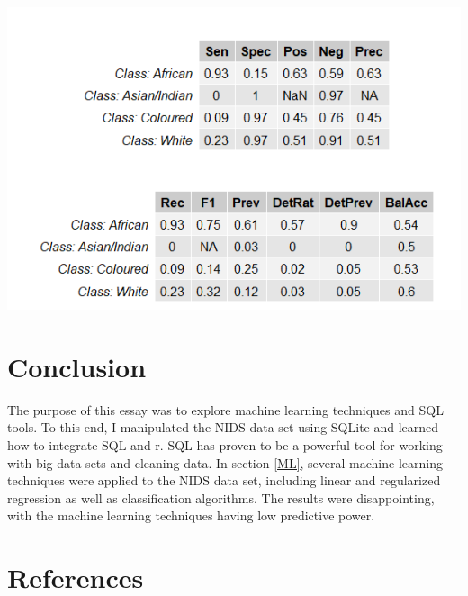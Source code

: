 \documentclass[11pt,preprint, authoryear]{elsarticle}
\let\origfigure\figure
\let\endorigfigure\endfigure
\renewenvironment{figure}[1][2] {
    \expandafter\origfigure\expandafter[H]
} {
    \endorigfigure
}
\numberwithin{equation}{section}
\numberwithin{figure}{section}
\numberwithin{table}{section}
\begin{document}
\begin{figure}[htbp]
\centering
\includegraphics{images/statsrf.png}
\caption{Random Forest Statistics \label{fig5}}
\end{figure}

\hypertarget{conclusion}{%
\section{\texorpdfstring{Conclusion
\label{con}}{Conclusion }}\label{conclusion}}

The purpose of this essay was to explore machine learning techniques and
SQL tools. To this end, I manipulated the NIDS data set using SQLite and
learned how to integrate SQL and r. SQL has proven to be a powerful tool
for working with big data sets and cleaning data. In section \ref{ML},
several machine learning techniques were applied to the NIDS data set,
including linear and regularized regression as well as classification
algorithms. The results were disappointing, with the machine learning
techniques having low predictive power.

\newpage

\hypertarget{references}{%
\section*{References}\label{references}}
\end{document}
